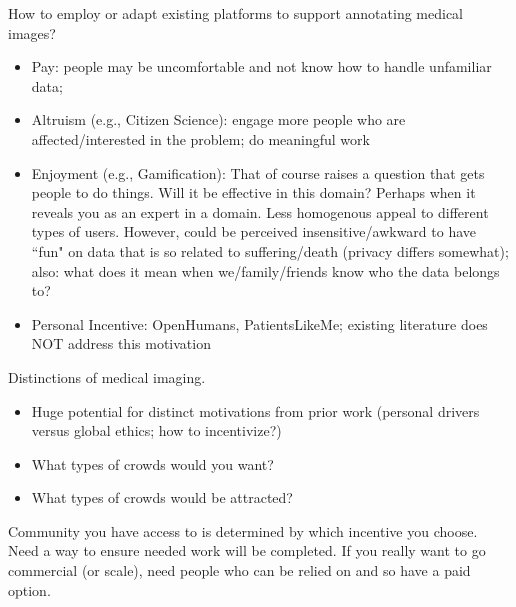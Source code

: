 \documentclass[10pt,twocolumn,letterpaper]{article}
\begin{document}
How to employ or adapt existing platforms to support annotating medical images?
\begin{itemize}
    \item Pay: people may be uncomfortable and not know how to handle unfamiliar data; 
    \item Altruism (e.g., Citizen Science): engage more people who are affected/interested in the problem; do meaningful work
    \item Enjoyment (e.g., Gamification): That of course raises a question that gets people to do things.  Will it be effective in this domain?  Perhaps when it reveals you as an expert in a domain.  Less homogenous appeal to different types of users.  However, could be perceived insensitive/awkward to have ``fun" on data that is so related to suffering/death (privacy differs somewhat); also: what does it mean when we/family/friends know who the data belongs to?  
    \item Personal Incentive: OpenHumans, PatientsLikeMe; existing literature does NOT address this motivation
\end{itemize}
Distinctions of medical imaging.
\begin{itemize}
    \item  Huge potential for distinct motivations from prior work (personal drivers versus global ethics; how to incentivize?)
    \item What types of crowds would you want? 
    \item What types of crowds would be attracted?

\end{itemize}
Community you have access to is determined by which incentive you choose.  Need a way to ensure needed work will be completed.  If you really want to go commercial (or scale), need people who can be relied on and so have a paid option.  
\end{document}
